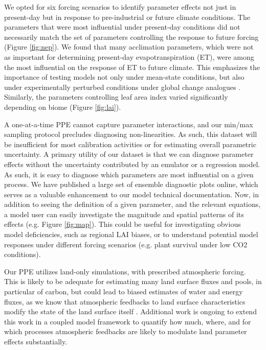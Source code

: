 \documentclass[draft]{agujournal2019}
\begin{document}
We opted for six forcing scenarios to identify parameter effects not just in present-day but in response to pre-industrial or future climate conditions. The parameters that were most influential under present-day conditions did not necessarily match the set of parameters controlling the response to future forcing (Figure \ref{fig:nep}). We found that many acclimation parameters, which were not as important for determining present-day evapotranspiration (ET), were among the most influential on the response of ET to future climate. This emphasizes the importance of testing models not only under mean-state conditions, but also under experimentally perturbed conditions under global change analogues \cite{wieder2019}.
Similarly, the parameters controlling leaf area index varied significantly depending on biome (Figure \ref{fig:lai}). 

A one-at-a-time PPE cannot capture parameter interactions, and our min/max sampling protocol precludes diagnosing non-linearities. As such, this dataset will be insufficient for most calibration activities or for estimating overall parametric uncertainty. A primary utility of our dataset is that we can diagnose parameter effects without the uncertainty contributed by an emulator or a regression model. As such, it is easy to diagnose which parameters are most influential on a given process. We have published a large set of ensemble diagnostic plots online, which serves as a valuable enhancement to our model technical documentation. Now, in addition to seeing the definition of a given parameter, and the relevant equations, a model user can easily investigate the magnitude and spatial patterns of its effects (e.g. Figure \ref{fig:map}). This could be useful for investigating obvious model deficiencies, such as regional LAI biases, or to understand potential model responses under different forcing scenarios (e.g. plant survival under low CO2 conditions).  

Our PPE utilizes land-only simulations, with prescribed atmospheric forcing. This is likely to be adequate for estimating many land surface fluxes and pools, in particular of carbon, but could lead to biased estimates of water and energy fluxes, as we know that atmospheric feedbacks to land surface characteristics modify the state of the land surface itself \cite{lague2019}. Additional work is ongoing to extend this work in a coupled model framework to quantify how much, where, and for which processes atmospheric feedbacks are likely to modulate land parameter effects substantially. 
\end{document}
